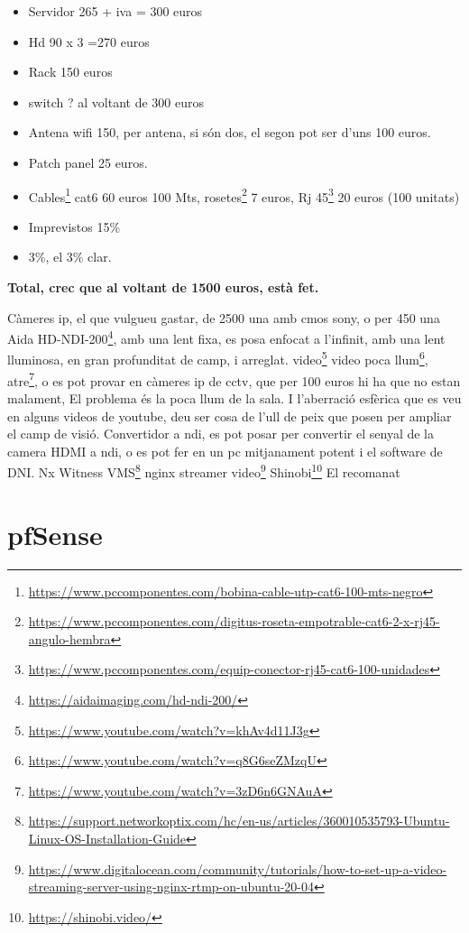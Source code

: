 \documentclass[
  10pt,
]{krantz}
\DeclareRobustCommand{\href}[2]{#2\footnote{\url{#1}}}
\providecommand{\tightlist}{%
  \setlength{\itemsep}{0pt}\setlength{\parskip}{0pt}}
\begin{document}
\begin{itemize}
\tightlist
\item
  Servidor 265 + iva = 300 euros
\item
  Hd 90 x 3 =270 euros
\item
  Rack 150 euros
\item
  switch ? al voltant de 300 euros
\item
  Antena wifi 150, per antena, si són dos, el segon pot ser d'uns 100 euros.
\item
  Patch panel 25 euros.
\item
  \href{https://www.pccomponentes.com/bobina-cable-utp-cat6-100-mts-negro}{Cables} cat6 60 euros 100 Mts, \href{https://www.pccomponentes.com/digitus-roseta-empotrable-cat6-2-x-rj45-angulo-hembra}{rosetes} 7 euros, \href{https://www.pccomponentes.com/equip-conector-rj45-cat6-100-unidades}{Rj 45} 20 euros (100 unitats)
\item
  Imprevistos 15\%
\item
  3\%, el 3\% clar.
\end{itemize}

\textbf{Total, crec que al voltant de 1500 euros, està fet.}

Càmeres ip, el que vulgueu gastar, de 2500 una amb cmos sony, o per 450 una \href{https://aidaimaging.com/hd-ndi-200/}{Aida HD-NDI-200}, amb una lent fixa, es posa enfocat a l'infinit, amb una lent lluminosa, en gran profunditat de camp, i arreglat. \href{https://www.youtube.com/watch?v=khAv4d11J3g}{video} \href{https://www.youtube.com/watch?v=q8G6seZMzqU}{video poca llum}, \href{https://www.youtube.com/watch?v=3zD6n6GNAuA}{atre}, o es pot provar en càmeres ip de cctv, que per 100 euros hi ha que no estan malament, El problema és la poca llum de la sala. I l'aberració esfèrica que es veu en alguns videos de youtube, deu ser cosa de l'ull de peix que posen per ampliar el camp de visió. Convertidor a ndi, es pot posar per convertir el senyal de la camera HDMI a ndi, o es pot fer en un pc mitjanament potent i el software de DNI. \href{https://support.networkoptix.com/hc/en-us/articles/360010535793-Ubuntu-Linux-OS-Installation-Guide}{Nx Witness VMS} \href{https://www.digitalocean.com/community/tutorials/how-to-set-up-a-video-streaming-server-using-nginx-rtmp-on-ubuntu-20-04}{nginx streamer video} \href{https://shinobi.video/}{Shinobi} El recomanat

\hypertarget{pfsense-2}{%
\chapter{pfSense}\label{pfsense-2}}
\end{document}
